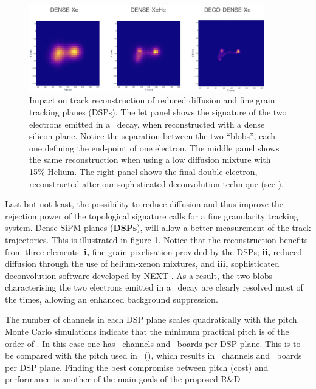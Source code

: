 \begin{figure}[htbp!]
  \begin{center}
      \includegraphics[width=0.91\textwidth]{img2/tracks.jpg}
    \caption{Impact on track reconstruction of reduced diffusion and fine grain tracking planes (DSPs). The let panel shows the signature of the two electrons emitted in a \bb\ decay, when reconstructed with a dense silicon plane. Notice the separation between the two ``blobs'', each one defining the end-point of one electron. The middle panel shows the same reconstruction when using a low diffusion mixture with 15\% Helium. The right panel shows the final double electron, reconstructed after our sophisticated deconvolution technique (see \cite{NEXT:2020jmz}).} 
    \label{fig.DSP}
  \end{center}
\end{figure}

\indent

Last but not least, the possibility to reduce diffusion and thus improve the rejection power of the topological signature calls for a fine granularity tracking system. Dense SiPM planes ({\bf DSPs}), will allow a better measurement of the track trajectories. This  is illustrated in figure  \ref{fig.DSP}. 
Notice that the reconstruction benefits from three elements: {\bf i,} fine-grain pixelisation provided by the DSPs;  {\bf ii,} reduced diffusion through the use of  helium-xenon mixtures, and {\bf iii,} sophisticated deconvolution software developed by NEXT \cite{NEXT:2020jmz}.  As a result, the two blobs characterising the two electrons emitted in a \bb\ decay are clearly resolved most of the times, allowing an enhanced background suppression. 

\indent

The number of channels in each DSP plane scales quadratically with the pitch. Monte Carlo simulations indicate that the minimum practical pitch is of the order of 
\DSPMNP. In this case one has \DSPMNPC\ channels and \DSPMNPB\ boards per DSP plane. This is to be compared with the pitch used in \NEW\ (\DSPMXP), 
which results in \DSPMXPC\ channels and \DSPMXPB\ boards per DSP plane. Finding the best compromise between pitch (cost) and performance is another of the main goals of the proposed R\&D

